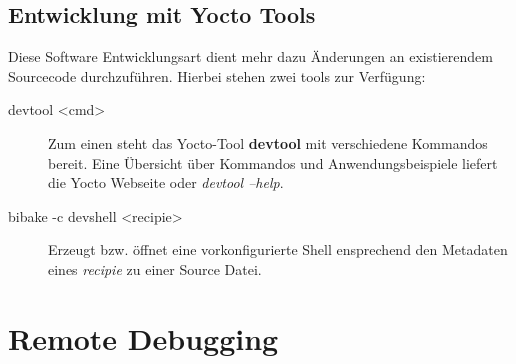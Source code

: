 \subsection{Entwicklung mit Yocto Tools}%
\label{sub:entwicklung_mit_yocto_tools}
Diese Software Entwicklungs\-art dient mehr dazu Änderungen an existierendem
Sourcecode durchzuführen. Hierbei stehen zwei tools zur Verfügung:

\begin{description}
    \item[devtool <cmd> ] Zum einen steht das Yocto-Tool \textbf{devtool} mit
        verschiedene Kommandos bereit. Eine Übersicht über Kommandos und
        Anwendungs\-beispiele liefert die Yocto Web\-seite oder \textit{devtool
            --help}.
    \item[bibake -c devshell <recipie>] Erzeugt bzw. öffnet eine
        vorkonfigurierte Shell ensprechend den Metadaten eines \textit{recipie}
        zu einer Source Datei.
\end{description}



\section{Remote Debugging}%
\label{sec:remote_debugging}



